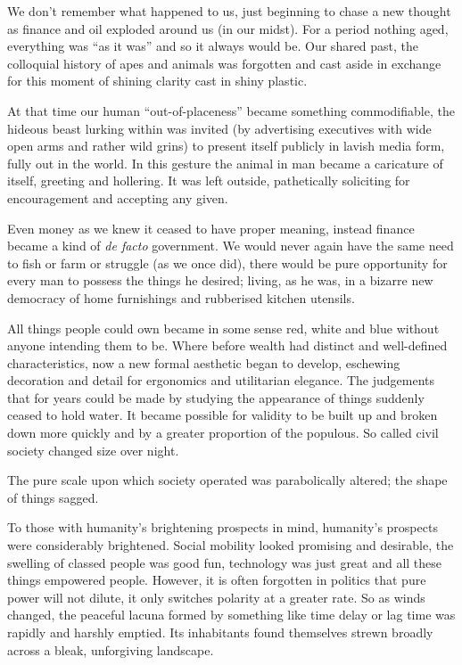 \documentclass{book}
\begin{document}
We don't remember what happened to us, just beginning to chase a new thought as
finance and oil exploded around us (in our midst). For a period nothing aged,
everything was ``as it was'' and so it always would be. Our shared past, the
colloquial history of apes and animals was forgotten and cast aside in exchange
for this moment of shining clarity cast in shiny plastic.

At that time our human ``out-of-placeness'' became something commodifiable, the
hideous beast lurking within was invited (by advertising executives with wide
open arms and rather wild grins) to present itself publicly in lavish media
form, fully out in the world. In this gesture the animal in man became a
caricature of itself, greeting and hollering. It was left outside, pathetically
soliciting for encouragement and accepting any given.

Even money as we knew it ceased to have proper meaning, instead finance became
a kind of \emph{de facto} government. We would never again have the same need to fish
or farm or struggle (as we once did), there would be pure opportunity for every man
to possess the things he desired; living, as he was, in a bizarre new
democracy of home furnishings and rubberised kitchen utensils.


All things people could own became in some sense red, white and blue without
anyone intending them to be. Where before wealth had distinct and well-defined
characteristics, now a new formal aesthetic began to develop, eschewing
decoration and detail for ergonomics and utilitarian elegance. The judgements
that for years could be made by studying the appearance of things suddenly
ceased to hold water.  It became possible for validity to be built up and
broken down more quickly and by a greater proportion of the populous. So called
civil society changed size over night.

The pure scale upon which society operated was parabolically altered; the shape
of things sagged.

To those with humanity's brightening prospects in mind, humanity's prospects
were considerably brightened. Social mobility looked promising and desirable,
the swelling of classed people was good fun, technology was just great and all
these things empowered people. However, it is often forgotten in politics that
pure power will not dilute, it only switches polarity at a greater rate. So as
winds changed, the peaceful lacuna formed by something like time delay or lag
time was rapidly and harshly emptied. Its inhabitants found themselves strewn
broadly across a bleak, unforgiving landscape.
\end{document}
